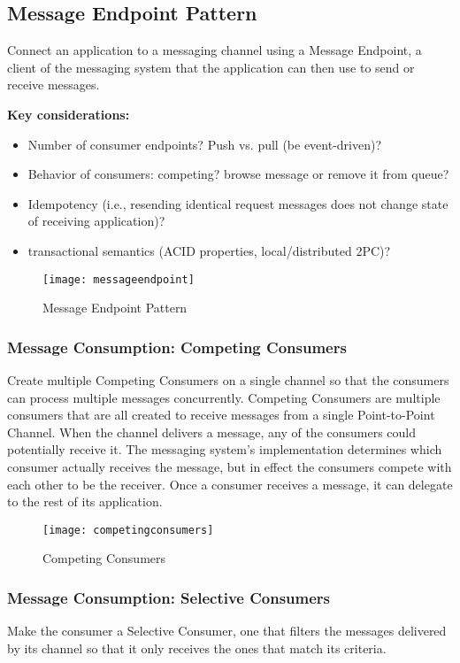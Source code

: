 \subsection{Message Endpoint Pattern}
Connect an application to a messaging channel using a Message Endpoint, a client of the messaging system that the application can then use to send or receive messages.

\textbf{Key considerations:}
\begin{itemize}
  \item Number of consumer endpoints? Push vs. pull (be event-driven)?
  \item Behavior of consumers: competing? browse message or remove it from queue?
  \item Idempotency (i.e., resending identical request messages does not change state of receiving application)?
  \item transactional semantics (ACID properties, local/distributed 2PC)?
\end{itemize}

\begin{figure}[H]
  \center
  \texttt{[image: messageendpoint]}
  \caption{Message Endpoint Pattern}
\end{figure}

\subsubsection{Message Consumption: Competing Consumers}
Create multiple Competing Consumers on a single channel so that the consumers can process multiple messages concurrently. Competing Consumers are multiple consumers that are all created to receive messages from a single Point-to-Point Channel. When the channel delivers a message, any of the consumers could potentially receive it. The messaging system's implementation determines which consumer actually receives the message, but in effect the consumers compete with each other to be the receiver. Once a consumer receives a message, it can delegate to the rest of its application.

\begin{figure}[H]
  \center
  \texttt{[image: competingconsumers]}
  \caption{Competing Consumers}
\end{figure}

\subsubsection{Message Consumption: Selective Consumers}
Make the consumer a Selective Consumer, one that filters the messages delivered by its channel so that it only receives the ones that match its criteria.

